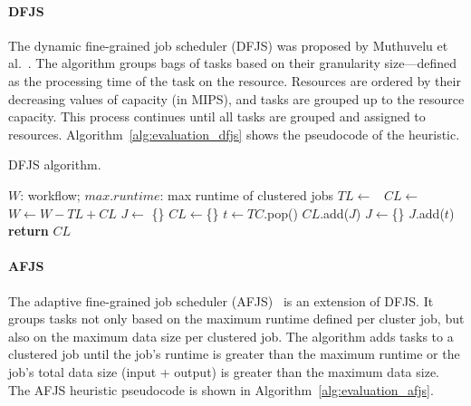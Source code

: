 \paragraph{\textbf{DFJS}}
The dynamic fine-grained job scheduler (DFJS) was proposed by Muthuvelu et al.~\cite{Muthuvelu:2005:DJG:1082290.1082297}. The algorithm groups bags of tasks based on their granularity size---defined as the processing time of the task on the resource. Resources are ordered by their decreasing values of capacity (in MIPS), and tasks are grouped up to the resource capacity. This process continues until all tasks are grouped and assigned to resources. Algorithm~\ref{alg:evaluation_dfjs} shows the pseudocode of the heuristic. 
 
\begin{algorithm}[!htb]
	\caption{ DFJS algorithm.}
	\footnotesize
	\label{alg:evaluation_dfjs}
	\begin{algorithmic}[1]
		\Require $W$: workflow; $max.runtime$: max runtime of clustered jobs 
				\State $TL\gets $\  
				\State $CL\gets$  \  
				\State $W \gets W - TL + CL$   
			\EndFor
		\EndProcedure
			\State $J\gets$ \{\}
			\State $CL\gets$\{\}
				\State $t \gets TC$.pop() 
				\State	$CL$.add($J$)
				\State	$J \gets$\{\}
				\EndIf	
				\State $J$.add($t$)
			\EndWhile
			\State \textbf{return} $CL$
		\EndProcedure
	\end{algorithmic}
\end{algorithm}


\paragraph{\textbf{AFJS}}
The adaptive fine-grained job scheduler (AFJS)~\cite{Liu2009} is an extension of DFJS. It groups tasks not only based on the maximum runtime defined per cluster job, but also on the maximum data size per clustered job. The algorithm adds tasks to a clustered job until the job's runtime is greater than the maximum runtime or the job's total data size (input + output) is greater than the maximum data size. The AFJS heuristic pseudocode is shown in Algorithm~\ref{alg:evaluation_afjs}. 

